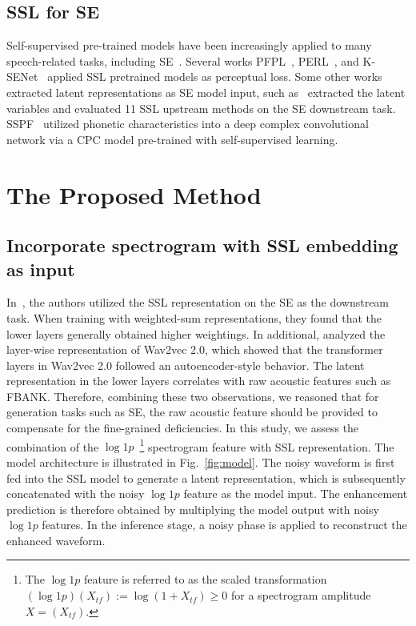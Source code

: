 \documentclass[a4paper]{article}
\begin{document}
\subsection{SSL for SE}
Self-supervised pre-trained models have been increasingly applied to many speech-related tasks, including SE~\cite{wang2020self, 9053925}. Several works PFPL~\cite{hsieh2020improving}, PERL~\cite{kataria2021perceptual}, and K-SENet~\cite{sun2021boosting} applied SSL pretrained models as perceptual loss.
Some other works extracted latent representations as SE model input, such as~\cite{ZiliSSL,tsai2022superb} extracted the latent variables and evaluated 11 SSL upstream methods on the SE downstream task. SSPF~\cite{qiu2021self} utilized phonetic characteristics into a
deep complex convolutional network via a CPC model pre-trained with self-supervised
learning.





\section{The Proposed Method}

\subsection{Incorporate spectrogram with SSL embedding as input}
In~\cite{ZiliSSL}, the authors utilized the SSL representation on the SE as the downstream task. When training with weighted-sum representations, they found that the lower layers generally obtained higher weightings. In additional, \cite{9688093} analyzed the layer-wise representation of Wav2vec 2.0, which showed that the transformer layers in Wav2vec 2.0 followed an autoencoder-style behavior. The latent representation in the lower layers correlates with raw acoustic features such as FBANK. Therefore, combining these two observations, we reasoned that for generation tasks such as SE, the raw acoustic feature should be provided to compensate for the fine-grained deficiencies. In this study, we assess the combination of the $\log 1p$~\cite{fu2020boosting}\footnote{The $\log 1p$ feature is referred to as the scaled transformation $(\log 1p)(X_{tf}):= \log (1 + X_{tf}) \geq 0$ for a spectrogram amplitude $X = (X_{tf})$.} spectrogram feature with SSL representation. The model architecture is illustrated in Fig.~\ref{fig:model}. The noisy waveform is first fed into the SSL model to generate a latent representation, which is subsequently concatenated with the noisy $\log 1p$ feature as the model input. The enhancement prediction is therefore obtained by multiplying the model output with noisy $\log 1p$ features. In the inference stage, a noisy phase is applied to reconstruct the enhanced waveform.
\end{document}
